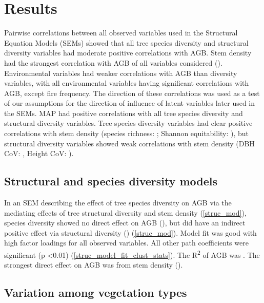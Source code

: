 \documentclass[11pt,a4paper]{article}
\begin{document}
\section{Results}


Pairwise correlations between all observed variables used in the Structural Equation Models (SEMs) showed that all tree species diversity and structural diversity variables had moderate positive correlations with AGB. Stem density had the strongest correlation with AGB of all variables considered (\ccib{}). Environmental variables had weaker correlations with AGB than diversity variables, with all environmental variables having significant correlations with AGB, except fire frequency. The direction of these correlations was used as a test of our assumptions for the direction of influence of latent variables later used in the SEMs. MAP had positive correlations with all tree species diversity and structural diversity variables. Tree species diversity variables had clear positive correlations with stem density (species richness: \ccsi{}; Shannon equitability: \ccei{}), but structural diversity variables showed weak correlations with stem density (DBH CoV: \ccdvi{}, Height CoV: \cchvi{}).

\subsection{Structural and species diversity models}

In an SEM describing the effect of tree species diversity on AGB via the mediating effects of tree structural diversity and stem density (\autoref{struc_mod}), species diversity showed no direct effect on AGB (\strucbetadb{}), but did have an indirect positive effect via structural diversity (\strucbetadib{}) (\autoref{struc_mod}). Model fit was good with high factor loadings for all observed variables. All other path coefficients were significant (p <0.01) (\autoref{struc_model_fit_clust_stats}). The R\textsuperscript{2} of AGB was \strucrsq{}. The strongest direct effect on AGB was from stem density (\strucbetaib{}).


\subsection{Variation among vegetation types}
\end{document}
